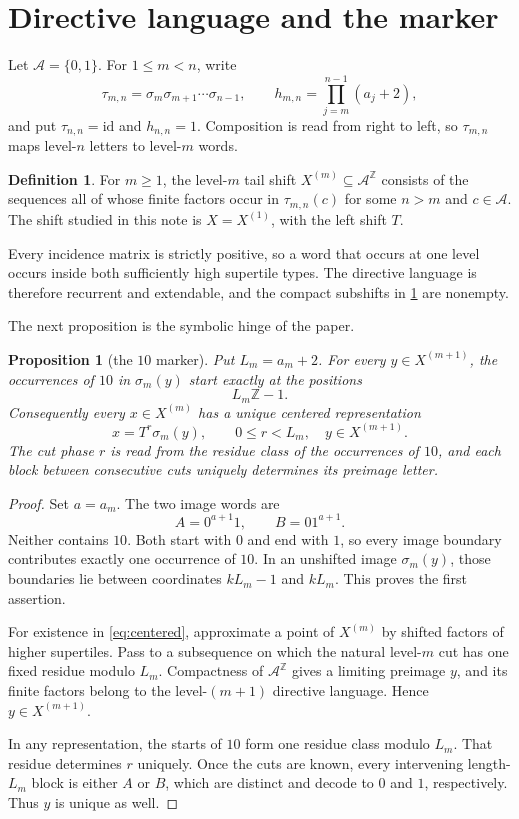\documentclass[11pt,a4paper]{amsart}
\newtheorem{proposition}[theorem]{Proposition}
\theoremstyle{definition}
\newtheorem{definition}[theorem]{Definition}
\theoremstyle{remark}
\newcommand{\A}{\mathcal A}
\newcommand{\Z}{\mathbb Z}
\begin{document}
\section{Directive language and the marker}

Let $\A=\{0,1\}$.  For $1\leq m<n$, write
\[
 \tau_{m,n}=\sigma_m\sigma_{m+1}\cdots\sigma_{n-1},
 \qquad
 h_{m,n}=\prod_{j=m}^{n-1}(a_j+2),
\]
and put $\tau_{n,n}=\mathrm{id}$ and $h_{n,n}=1$.  Composition is read from
right to left, so $\tau_{m,n}$ maps level-$n$ letters to level-$m$ words.

\begin{definition}\label{def:tails}
For $m\geq1$, the level-$m$ tail shift $X^{(m)}\subseteq\A^{\Z}$ consists
of the sequences all of whose finite factors occur in
$\tau_{m,n}(c)$ for some $n>m$ and $c\in\A$.  The shift studied in this note
is $X=X^{(1)}$, with the left shift $T$.
\end{definition}

Every incidence matrix is strictly positive, so a word that occurs at one
level occurs inside both sufficiently high supertile types.  The directive
language is therefore recurrent and extendable, and the compact subshifts in
\cref{def:tails} are nonempty.

The next proposition is the symbolic hinge of the paper.

\begin{proposition}[the $10$ marker]\label{prop:marker}
Put $L_m=a_m+2$.  For every $y\in X^{(m+1)}$, the occurrences of $10$ in
$\sigma_m(y)$ start exactly at the positions
\[
 L_m\Z-1.
\]
Consequently every $x\in X^{(m)}$ has a unique centered representation
\begin{equation}\label{eq:centered}
 x=T^r\sigma_m(y),
 \qquad 0\leq r<L_m,\quad y\in X^{(m+1)}.
\end{equation}
The cut phase $r$ is read from the residue class of the occurrences of $10$,
and each block between consecutive cuts uniquely determines its preimage
letter.
\end{proposition}

\begin{proof}
Set $a=a_m$.  The two image words are
\[
 A=0^{a+1}1,
 \qquad B=01^{a+1}.
\]
Neither contains $10$.  Both start with $0$ and end with $1$, so every image
boundary contributes exactly one occurrence of $10$.  In an unshifted image
$\sigma_m(y)$, those boundaries lie between coordinates $kL_m-1$ and
$kL_m$.  This proves the first assertion.

For existence in \eqref{eq:centered}, approximate a point of $X^{(m)}$ by
shifted factors of higher supertiles.  Pass to a subsequence on which the
natural level-$m$ cut has one fixed residue modulo $L_m$.  Compactness of
$\A^{\Z}$ gives a limiting preimage $y$, and its finite factors belong to the
level-$(m+1)$ directive language.  Hence $y\in X^{(m+1)}$.

In any representation, the starts of $10$ form one residue class modulo
$L_m$.  That residue determines $r$ uniquely.  Once the cuts are known,
every intervening length-$L_m$ block is either $A$ or $B$, which are
distinct and decode to $0$ and $1$, respectively.  Thus $y$ is unique as
well.
\end{proof}
\end{document}
